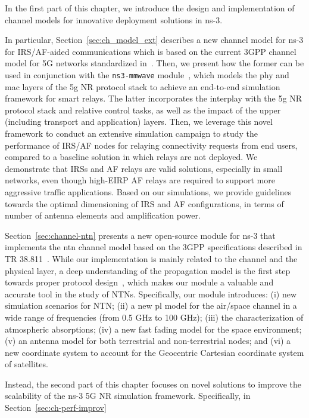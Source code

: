 In the first part of this chapter, we introduce the design and implementation of channel models for innovative deployment solutions in ns-3. 

In particular, Section~\ref{sec:ch_model_ext} describes a new channel model for ns-3 for IRS/AF-aided communications which is based on the current 3GPP channel model for 5G networks standardized in~\cite{3gpp.38.901}. 
Then, we present how the former can be used in conjunction with the \texttt{ns3-mmwave} module~\cite{mezzavilla2018end}, which models the \gls{phy} and \gls{mac} layers of the \gls{5g} NR protocol stack to achieve an end-to-end simulation framework for smart relays. The latter incorporates the interplay with the \gls{5g} NR protocol stack and relative control tasks, as well as the impact of the upper (including transport and application) layers. Then, we leverage this novel framework to conduct an extensive simulation campaign to study the performance of IRS/AF nodes for relaying connectivity requests from end users, compared to a baseline solution in which relays are not deployed. We demonstrate that IRSs and AF relays are valid solutions, especially in small networks, even though high-EIRP AF relays are required to support more aggressive traffic applications. Based on our simulations, we provide guidelines towards the optimal dimensioning of IRS and AF configurations, in terms of number of antenna elements and amplification power.

Section~\ref{sec:channel-ntn} presents a new open-source module for ns-3 that implements the \gls{ntn} channel model based on the 3GPP specifications described in TR 38.811~\cite{38811}.
While our implementation is mainly related to the channel and the physical layer, a deep understanding of the propagation model is the first step towards proper protocol design~\cite{lecci2021accuracy}, which makes our module a valuable and accurate tool in the study of NTNs.
Specifically, our module introduces: (i) new simulation scenarios for NTN; (ii) a new \gls{pl} model for the air/space channel in a wide range of frequencies (from 0.5 GHz to 100 GHz); (iii) the characterization of atmospheric absorptions; (iv) a new fast fading model for the space environment; (v) an antenna model for both terrestrial and non-terrestrial nodes; and (vi) a new coordinate system to account for the Geocentric Cartesian coordinate system of satellites. 

Instead, the second part of this chapter focuses on novel solutions to improve the scalability of the ns-3 5G NR simulation framework. Specifically, in Section~\ref{sec:ch-perf-improv}


